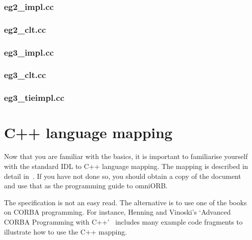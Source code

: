 \documentclass[11pt,twoside,a4paper]{book}
\begin{document}
\clearpage
\subsection{eg2\_impl.cc}



\clearpage
\subsection{eg2\_clt.cc}



\clearpage
\subsection{eg3\_impl.cc}



\clearpage
\subsection{eg3\_clt.cc}



\clearpage
\subsection{eg3\_tieimpl.cc}




\chapter{C++ language mapping}

Now that you are familiar with the basics, it is important to
familiarise yourself with the standard IDL to C++ language mapping.
The mapping is described in detail in~\cite{cxxmapping}. If you have
not done so, you should obtain a copy of the document and use that as
the programming guide to omniORB.

The specification is not an easy read. The alternative is to use one
of the books on CORBA programming. For instance, Henning and Vinoski's
`Advanced CORBA Programming with C++'~\cite{henning1999} includes many
example code fragments to illustrate how to use the C++ mapping.
\end{document}
